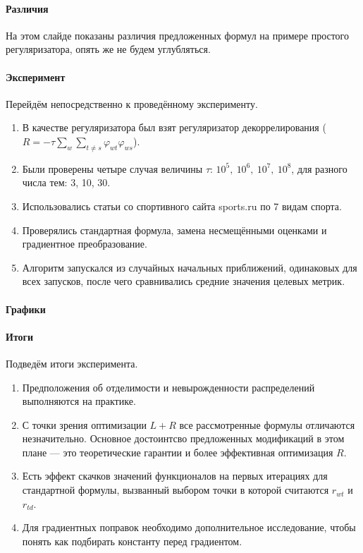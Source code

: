 \documentclass[12pt]{article}
\renewcommand{\phi}{\varphi}
\begin{document}
\paragraph{Различия}
На этом слайде показаны различия предложенных формул на примере простого регуляризатора, опять же не будем углубляться.

\paragraph{Эксперимент}
Перейдём непосредственно к проведённому эксперименту.
\begin{enumerate}
\item В качестве регуляризатора был взят регуляризатор декоррелирования ($R = -\tau\sum\limits_w \sum\limits_{t \neq s} \phi_{wt} \phi_{ws}$).
\item Были проверены четыре случая величины $\tau$: $10^5,~10^6,~10^7,~10^8$, для разного числа тем: 3, 10, 30.
\item Использовались статьи со спортивного сайта sports.ru по 7 видам спорта.
\item Проверялись стандартная формула, замена несмещёнными оценками и градиентное преобразование.
\item Алгоритм  запускался из случайных начальных приближений, одинаковых для всех запусков, после чего сравнивались средние значения целевых метрик.
\end{enumerate}

\paragraph{Графики}

\paragraph{Итоги}
Подведём итоги эксперимента.
\begin{enumerate}
\item Предположения об отделимости и невырожденности распределений выполняются на практике.
\item С точки зрения оптимизации $L +  R$ все рассмотренные формулы отличаются незначительно. Основное достоинтсво предложенных модификаций в этом плане --- это теоретические гарантии и более эффективная оптимизация $R$.
\item Есть эффект скачков значений функционалов на первых итерациях для стандартной формулы, вызванный выбором точки в которой считаются $r_{wt}$ и $r_{td}$.
\item Для градиентных поправок необходимо дополнительное исследование, чтобы понять как подбирать константу перед градиентом.
\end{enumerate}
\end{document}
